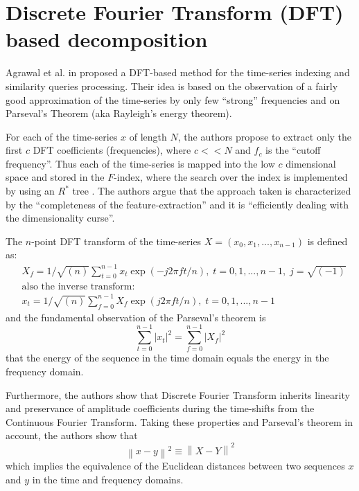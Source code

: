 \section{Discrete Fourier Transform (DFT) based decomposition}
Agrawal et al. in \cite{citeulike:3973409} proposed a DFT-based method for the time-series indexing and similarity queries processing. Their idea is based on the observation of a fairly good approximation of the time-series by only few ``strong'' frequencies and on Parseval's Theorem (aka Rayleigh's energy theorem). 

For each of the time-series $x$ of length $N$, the authors propose to extract only the first $c$ DFT coefficients (frequencies), where $c<<N$ and $f_{c}$ is the ``cutoff frequency''. Thus each of the time-series is mapped into the low $c$ dimensional space and stored in the $F$-index, where the search over the index is implemented by using an $R^{*}$ tree \cite{citeulike:343069}. The authors argue that the approach taken is characterized by the ``completeness of the feature-extraction'' and it is ``efficiently dealing with the dimensionality curse''. 

The $n$-point DFT transform of the time-series $X=(x_{0}, x_{1}, ... , x_{n-1})$ is defined as:
\begin{align}
& X_{f} = 1/\sqrt{(n)}\sum_{t=0}^{n-1} x_{t} \exp(-j2 \pi f t/n),\; t=0,1,...,n-1, \; j=\sqrt{(-1)} \\
& \text{also the inverse transform:} \nonumber \\
& x_{t} = 1/\sqrt{(n)}\sum_{f=0}^{n-1} X_{f} \exp(j2 \pi f t/n),\; t=0,1,...,n-1 
\end{align}
and the fundamental observation of the Parseval's theorem is
\begin{equation}
\sum_{t=0}^{n-1} \left| x_{t} \right| ^{2} = \sum_{f=0}^{n-1} \left| X_{f} \right| ^{2}
\label{eq:parseval}
\end{equation}
that the energy of the sequence in the time domain equals the energy in the frequency domain.

Furthermore, the authors show that Discrete Fourier Transform inherits linearity and preservance of amplitude coefficients during the time-shifts from the Continuous Fourier Transform. Taking these properties and Parseval's theorem in account, the authors show that
\begin{equation}
\left\| x - y \right\| ^{2} \equiv \left\| X - Y \right\| ^{2}
\label{eq:dft_similarity}
\end{equation}
which implies the equivalence of the Euclidean distances between two sequences $x$ and $y$ in the time and frequency domains. 

